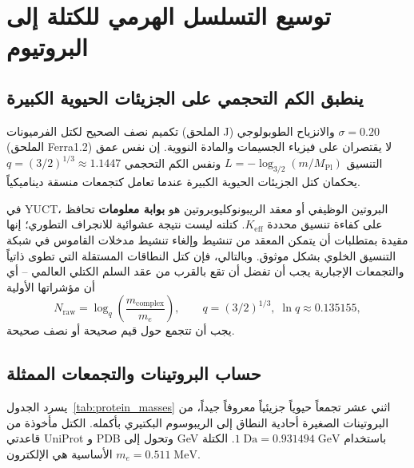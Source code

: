 \documentclass[11pt,a4paper]{article}
\begin{document}
	\section{توسيع التسلسل الهرمي للكتلة إلى البروتيوم}
	\label{sec:protein_hierarchy}
	
	\subsection{ينطبق الكم التحجمي على الجزيئات الحيوية الكبيرة}
	
	تكميم نصف الصحيح لكتل الفرميونات (الملحق J) والانزياح الطوبولوجي \(\sigma = 0.20\) (الملحق Ferra1.2) لا يقتصران على فيزياء الجسيمات والمادة النووية. إن نفس عمق التنسيق \(L = -\log_{3/2}(m/M_{\mathrm{Pl}})\) ونفس الكم التحجمي \(q = (3/2)^{1/3} \approx 1.1447\) يحكمان كتل الجزيئات الحيوية الكبيرة عندما تعامل كتجمعات منسقة ديناميكياً.
	
	في YUCT، البروتين الوظيفي أو معقد الريبونوكليوبروتين هو \textbf{بوابة معلومات} تحافظ على كفاءة تنسيق محددة \(K_{\mathrm{eff}}\). كتلته ليست نتيجة عشوائية للانجراف التطوري؛ إنها مقيدة بمتطلبات أن يتمكن المعقد من تنشيط وإلغاء تنشيط مدخلات القاموس في شبكة التنسيق الخلوي بشكل موثوق. وبالتالي، فإن كتل النطاقات المستقلة التي تطوى ذاتياً والتجمعات الإجبارية يجب أن تفضل أن تقع بالقرب من عقد السلم الكتلي العالمي – أي أن مؤشراتها الأولية
	\[
	N_{\mathrm{raw}} = \log_q\!\left(\frac{m_{\mathrm{complex}}}{m_e}\right),
	\qquad q = (3/2)^{1/3},\; \ln q \approx 0.135155,
	\]
	يجب أن تتجمع حول قيم صحيحة أو نصف صحيحة.
	
	\subsection{حساب البروتينات والتجمعات الممثلة}
	
	يسرد الجدول~\ref{tab:protein_masses} اثني عشر تجمعاً حيوياً جزيئياً معروفاً جيداً، من البروتينات الصغيرة أحادية النطاق إلى الريبوسوم البكتيري بأكمله. الكتل مأخوذة من قاعدتي UniProt و PDB وتحول إلى GeV باستخدام \(1\;\text{Da} = 0.931494\;\text{GeV}\). الكتلة الأساسية هي الإلكترون \(m_e = 0.511\;\text{MeV}\).
	
\end{document}
